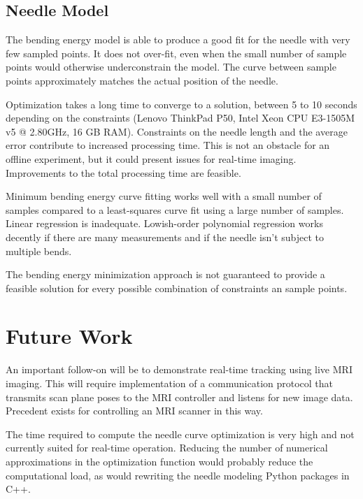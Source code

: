 

\subsection{Needle Model}
The bending energy model is able to produce a good fit for the needle with very few sampled points. It does not over-fit, even when the small number of sample points would otherwise underconstrain the model. The curve between sample points approximately matches the actual position of the needle. 

Optimization takes a long time to converge to a solution, between 5 to 10 seconds depending on the constraints (Lenovo ThinkPad P50, Intel Xeon CPU E3-1505M v5 @ 2.80GHz, 16 GB RAM). Constraints on the needle length and the average error contribute to increased processing time. This is not an obstacle for an offline experiment, but it could present issues for real-time imaging. Improvements to the total processing time are feasible.

Minimum bending energy curve fitting works well with a small number of samples compared to a least-squares curve fit using a large number of samples. Linear regression is inadequate. Lowish-order polynomial regression works decently if there are many measurements and if the needle isn't subject to multiple bends.

The bending energy minimization approach is not guaranteed to provide a feasible solution for every possible combination of constraints an sample points.


\section{Future Work}
An important follow-on will be to demonstrate real-time tracking using live MRI imaging. This will require implementation of a communication protocol that transmits scan plane poses to the MRI controller and listens for new image data. Precedent exists for controlling an MRI scanner in this way\cite{patel_closed-loop_2015}.

The time required to compute the needle curve optimization is very high and not currently suited for real-time operation. Reducing the number of numerical approximations in the optimization function would probably reduce the computational load, as would rewriting the needle modeling Python packages in C++.

